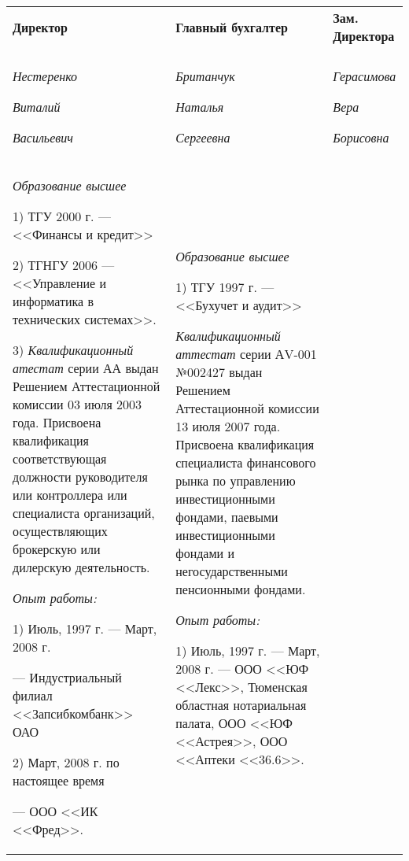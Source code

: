 \documentclass[a4paper,12pt]{scrreprt}
\begin{document}
\footnotesize
\tablefont
\begin{longtable}{|p{}  p{}  p{} } 

\normalsize{\textbf{Директор}}  & \normalsize{\textbf{Главный бухгалтер}}  & \normalsize{\textbf{Зам. Директора}}  \tabularnewline

 & & \tabularnewline

\emph{Нестеренко}

\emph{Виталий}

\emph{Васильевич} 

&

\emph{Британчук}

\emph{Наталья}

\emph{Сергеевна}

& 

\emph{Герасимова}

\emph{Вера}

\emph{Борисовна}


\tabularnewline


\emph{Образование высшее} 

1) ТГУ 2000 г. --- <<Финансы и кредит>>

2) ТГНГУ 2006 --- <<Управление и информатика в технических  системах>>. 

3) \emph{ Квалификационный атестат} серии АА \No030312 выдан Решением Аттестационной комиссии  03 июля 2003 года. Присвоена квалификация соответствующая должности руководителя или контроллера или специалиста организаций, осуществляющих брокерскую или дилерскую деятельность. 

\emph{Опыт работы:}

1) Июль, 1997 г. --- Март, 2008 г. 

--- Индустриальный филиал <<Запсибкомбанк>> ОАО

2) Март, 2008 г. по настоящее время 

--- ООО <<ИК <<Фред>>.

& \emph{Образование высшее} 

1) ТГУ 1997 г. --- <<Бухучет и аудит>>

\emph{Квалификационный аттестат} серии АV-001 №002427 выдан Решением Аттестационной комиссии 13 июля 2007 года. Присвоена квалификация специалиста финансового рынка по управлению инвестиционными фондами, паевыми инвестиционными фондами и негосударственными пенсионными фондами.

\emph{Опыт работы:} 

1) Июль, 1997 г. --- Март, 2008 г. --- ООО <<ЮФ <<Лекс>>, Тюменская областная нотариальная палата, ООО <<ЮФ <<Астрея>>, ООО <<Аптеки <<36.6>>.


\end{longtable}
\end{document}

